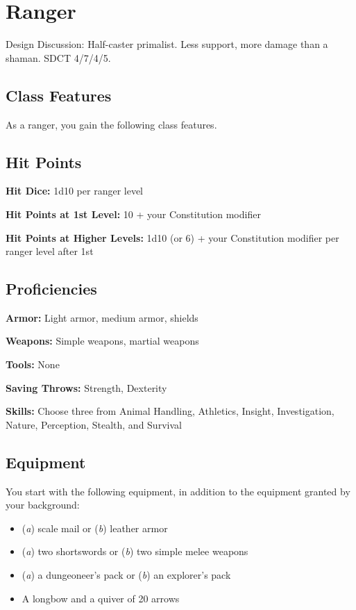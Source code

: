 \section{Ranger}\label{class:ranger}

Design Discussion: Half-caster primalist. Less support, more damage than a shaman. SDCT 4/7/4/5.

\subsection{Class Features}

As a ranger, you gain the following class features.

\subsection{Hit Points}

\textbf{Hit Dice:} 1d10 per ranger level

\textbf{Hit Points at 1st Level:} 10 + your Constitution modifier

\textbf{Hit Points at Higher Levels:} 1d10 (or 6) + your Constitution modifier per ranger level after 1st

\subsection{Proficiencies}

\textbf{Armor:} Light armor, medium armor, shields

\textbf{Weapons:} Simple weapons, martial weapons

\textbf{Tools:} None

\textbf{Saving Throws:} Strength, Dexterity

\textbf{Skills:} Choose three from Animal Handling, Athletics, Insight, Investigation, Nature, Perception, Stealth, and Survival

\subsection{Equipment}

You start with the following equipment, in addition to the equipment granted by your background:
\begin{itemize}
\item (\textit{a}) scale mail or (\textit{b}) leather armor
\item (\textit{a}) two shortswords or (\textit{b}) two simple melee weapons
\item (\textit{a}) a dungeoneer's pack or (\textit{b}) an explorer's pack
\item A longbow and a quiver of 20 arrows
\end{itemize}

